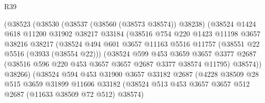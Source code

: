 \begin{lexlean}{R39}
\begin{coremodule}
                          (@38523
                            (@38530
                              (@38537 (@38560 (@38573 @38574)) @38238)
                              (@38524
                                @1424
                                @618
                                @11200
                                @31902
                                @38217
                                @33184
                                (@38516
                                  @754
                                  @220
                                  @1423
                                  @11198
                                  @3657
                                  @38216
                                  @38217
                                  (@38524
                                    @494
                                    @601
                                    @3657
                                    @11163
                                    @5516
                                    @11757
                                    (@38551 @22 @5516 (@3933 (@38554 @22)))
                                    (@38524
                                      @599
                                      @453
                                      @3659
                                      @3657
                                      @3377
                                      @2687
                                      (@38516 @596 @220 @453 @3657 @3657 @2687 @3377 @38574 @11795)
                                      @38574))
                                  @38266)
                                (@38524
                                  @594
                                  @453
                                  @31900
                                  @3657
                                  @33182
                                  @2687
                                  (@4228
                                    @38509
                                    @28
                                    @515
                                    @3659
                                    @31899
                                    @11606
                                    @33182
                                    (@38524
                                      @513
                                      @453
                                      @3657
                                      @3657
                                      @512
                                      @2687
                                      (@11633 @38509 @72 @512)
                                      @38574)

\end{coremodule}
\end{lexlean}
